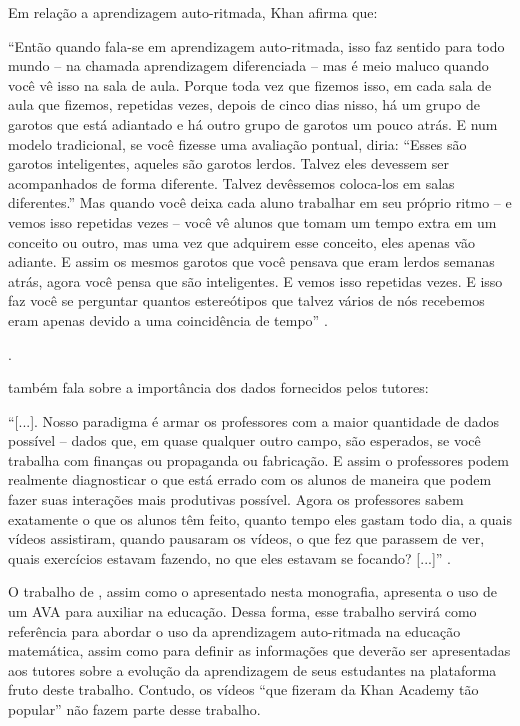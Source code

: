 Em relação a aprendizagem auto-ritmada, Khan afirma que:
\begin{citacao}
``Então quando fala-se em aprendizagem auto-ritmada, isso faz sentido para todo mundo – na chamada aprendizagem diferenciada – mas é meio maluco quando você vê isso na sala de aula. Porque toda vez 
que fizemos isso, em cada sala de aula que fizemos, repetidas vezes, depois de cinco dias nisso, há um grupo de garotos que está adiantado e há outro grupo de garotos um pouco atrás. E num modelo 
tradicional, se você fizesse uma avaliação pontual, diria: ``Esses são garotos inteligentes, aqueles são garotos lerdos. Talvez eles devessem ser acompanhados de forma diferente. Talvez devêssemos 
coloca-los em salas diferentes.'' Mas quando você deixa cada aluno trabalhar em seu próprio ritmo – e vemos isso repetidas vezes – você vê alunos que tomam um tempo extra em um conceito ou outro, mas 
uma vez que adquirem esse conceito, eles apenas vão adiante. E assim os mesmos garotos que você pensava que eram lerdos semanas atrás, agora você pensa que são inteligentes. E vemos isso repetidas 
vezes. E isso faz você se perguntar quantos estereótipos que talvez vários de nós recebemos eram apenas devido a uma coincidência de tempo'' \cite[13:29, Tradu\c{c}\~ao 
Livre]{tedtalk2011reinvend}.
\end{citacao}.


 também fala sobre a importância dos dados fornecidos pelos tutores:
\begin{citacao}
``[...]. Nosso paradigma é armar os professores com a maior quantidade de dados possível – dados que, em quase qualquer outro campo, são esperados, se você trabalha com finanças ou propaganda ou 
fabricação. E assim o professores podem realmente diagnosticar o que está errado com os alunos de maneira que podem fazer suas interações mais produtivas possível. Agora os professores sabem 
exatamente o que os alunos têm feito, quanto tempo eles gastam todo dia, a quais vídeos assistiram, quando pausaram os vídeos, o que fez que parassem de ver, quais exercícios estavam fazendo, no que 
eles estavam se focando? [...]'' \cite[12:26, Tradu\c{c}\~ao Livre]{tedtalk2011reinvend}.
\end{citacao}

O trabalho de , assim como o apresentado nesta monografia, apresenta o uso de um AVA para auxiliar na educação. Dessa forma, esse trabalho servirá como referência para abordar 
o uso da aprendizagem auto-ritmada na educação matemática, assim como para definir as informações que deverão ser apresentadas aos tutores sobre a evolução da aprendizagem de seus estudantes na 
plataforma fruto deste trabalho. Contudo, os vídeos ``que fizeram da Khan Academy tão popular'' não fazem parte desse trabalho.


